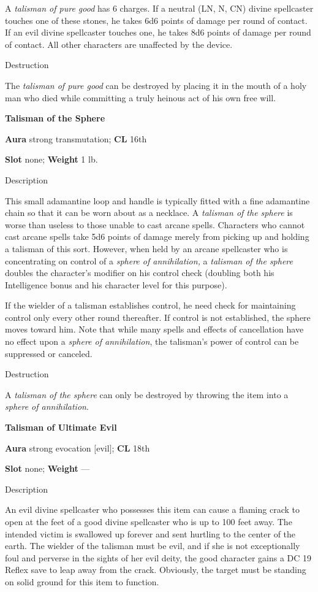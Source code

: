 A \textit{talisman of pure good} has 6 charges. If a neutral (LN, N, CN) divine spellcaster touches one of these stones, he takes 6d6 points of damage per round of contact. If an evil divine spellcaster touches one, he takes 8d6 points of damage per round of contact. All other characters are unaffected by the device. 
				
Destruction
				
The \textit{talisman of pure good} can be destroyed by placing it in the mouth of a holy man who died while committing a truly heinous act of his own free will.
				
\textbf{Talisman of the Sphere}
				
\textbf{Aura} strong transmutation; \textbf{CL} 16th
				
\textbf{Slot} none; \textbf{Weight} 1 lb.
				
Description
				
This small adamantine loop and handle is typically fitted with a fine adamantine chain so that it can be worn about as a necklace. A \textit{talisman of the sphere} is worse than useless to those unable to cast arcane spells. Characters who cannot cast arcane spells take 5d6 points of damage merely from picking up and holding a talisman of this sort. However, when held by an arcane spellcaster who is concentrating on control of a \textit{sphere of annihilation, }a \textit{talisman of the sphere }doubles the character's modifier on his control check (doubling both his Intelligence bonus and his character level for this purpose).
				
If the wielder of a talisman establishes control, he need check for maintaining control only every other round thereafter. If control is not established, the sphere moves toward him. Note that while many spells and effects of cancellation have no effect upon a \textit{sphere of annihilation}, the talisman's power of control can be suppressed or canceled. 
				
Destruction
				
A \textit{talisman of the sphere} can only be destroyed by throwing the item into a \textit{sphere of annihilation}.
				
\textbf{Talisman of Ultimate Evil}
				
\textbf{Aura} strong evocation \mbox{$[$}evil\mbox{$]$}; \textbf{CL} 18th
				
\textbf{Slot} none; \textbf{Weight }---
				
Description
				
An evil divine spellcaster who possesses this item can cause a flaming crack to open at the feet of a good divine spellcaster who is up to 100 feet away. The intended victim is swallowed up forever and sent hurtling to the center of the earth. The wielder of the talisman must be evil, and if she is not exceptionally foul and perverse in the sights of her evil deity, the good character gains a DC 19 Reflex save to leap away from the crack. Obviously, the target must be standing on solid ground for this item to function. 
				
